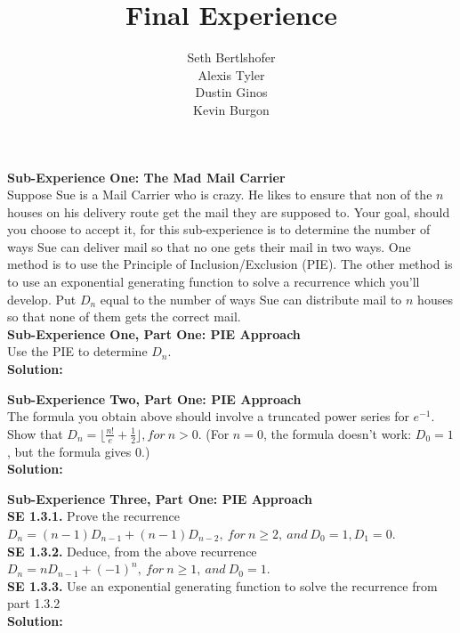 \documentclass[10pt,a4paper]{report}
\author{Seth Bertlshofer\\Alexis Tyler\\Dustin Ginos\\Kevin Burgon}
\title{Final Experience}
\begin{document}
	\maketitle
	\textbf{Sub-Experience One: The Mad Mail Carrier}\\
	Suppose Sue is a Mail Carrier who is crazy.  He likes to ensure that non of the $n$ houses on his delivery route get the mail they are supposed to.  Your goal, should you choose to accept it, for this sub-experience is to determine the number of ways Sue can deliver mail so that no one gets their mail in two ways.  One method is to use the Principle of Inclusion/Exclusion (PIE).  The other method is to use an exponential generating function to solve a recurrence which you'll develop.  Put $D_n$ equal to the number of ways Sue can distribute mail to $n$ houses so that none of them gets the correct mail.\\
	
	\textbf{Sub-Experience One, Part One: PIE Approach}\\
	Use the PIE to determine $D_n$.\\
	
	\textbf{Solution: }\\
	\newline


	\textbf{Sub-Experience Two, Part One: PIE Approach}\\
	The formula you obtain above should involve a truncated power series for $e^{-1}$.  Show that $D_n = \lfloor\frac{n!}{e}+\frac{1}{2}\rfloor, for\ n > 0$. (For $n=0$, the formula doesn't work: $D_0 = 1$, but the formula gives 0.)\\
	\newline
	\textbf{Solution: }\\
	\newline


	\textbf{Sub-Experience Three, Part One: PIE Approach}\\
	\newline
	\textbf{SE 1.3.1.} Prove the recurrence $D_n = (n-1)D_{n-1} + (n-1)D_{n-2},\ for\ n\geq 2,\ and\ D_0 = 1, D_1=0$.\\
	\textbf{SE 1.3.2.} Deduce, from the above recurrence $D_n = nD_{n-1}+(-1)^n,\ for\ n\geq 1,\ and\ D_0 = 1$.\\
	\textbf{SE 1.3.3.} Use an exponential generating function to solve the recurrence from part 1.3.2\\
	\newline
	\textbf{Solution: }\\
	\newline
\end{document}
